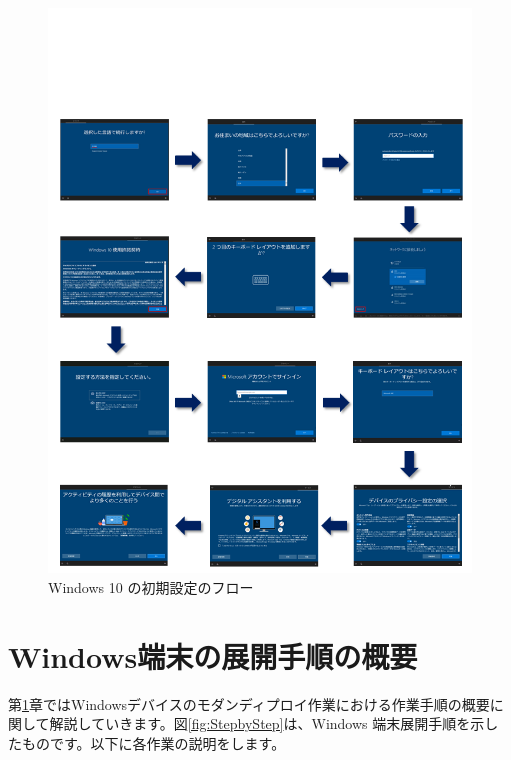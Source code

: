 \begin{figure}[t]
    \centering
    \vspace{-6cm}
    \includegraphics[width=17cm]{figures/Win10_Kitting.png}
    \caption{Windows 10 の初期設定のフロー}
    \label{fig:Win10_Kitting}
\end{figure}


\chapter{Windows端末の展開手順の概要}
\label{chap:Windows端末の展開手順の概要}

第\ref{chap:Windows端末の展開手順の概要}章ではWindowsデバイスのモダンディプロイ作業における作業手順の概要に関して解説していきます。図\ref{fig:StepbyStep}は、Windows 端末展開手順を示したものです。以下に各作業の説明をします。

